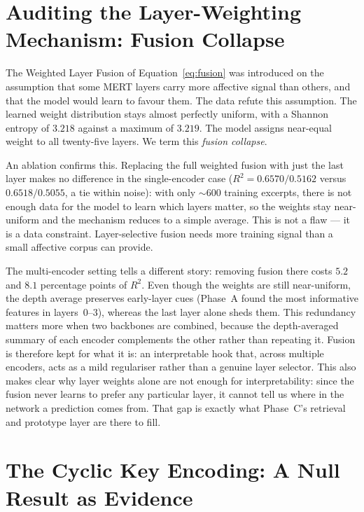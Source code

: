 \documentclass[12pt]{report}
\begin{document}
\section{Auditing the Layer-Weighting Mechanism: Fusion Collapse}
\label{sec:results-fusion}

The Weighted Layer Fusion of Equation~\ref{eq:fusion} was introduced on the assumption that some MERT layers carry more affective signal than others, and that the model would learn to favour them. The data refute this assumption. The learned weight distribution stays almost perfectly uniform, with a Shannon entropy of $3.218$ against a maximum of $3.219$. The model assigns near-equal weight to all twenty-five layers. We term this \emph{fusion collapse}.

An ablation confirms this. Replacing the full weighted fusion with just the last layer makes no difference in the single-encoder case ($R^{2}=0.6570/0.5162$ versus $0.6518/0.5055$, a tie within noise): with only $\sim\!600$ training excerpts, there is not enough data for the model to learn which layers matter, so the weights stay near-uniform and the mechanism reduces to a simple average. This is not a flaw --- it is a data constraint. Layer-selective fusion needs more training signal than a small affective corpus can provide.

The multi-encoder setting tells a different story: removing fusion there costs $5.2$ and $8.1$ percentage points of $R^{2}$. Even though the weights are still near-uniform, the depth average preserves early-layer cues (Phase~A found the most informative features in layers~$0$--$3$), whereas the last layer alone sheds them. This redundancy matters more when two backbones are combined, because the depth-averaged summary of each encoder complements the other rather than repeating it. Fusion is therefore kept for what it is: an interpretable hook that, across multiple encoders, acts as a mild regulariser rather than a genuine layer selector. This also makes clear why layer weights alone are not enough for interpretability: since the fusion never learns to prefer any particular layer, it cannot tell us where in the network a prediction comes from. That gap is exactly what Phase~C's retrieval and prototype layer are there to fill.

\section{The Cyclic Key Encoding: A Null Result as Evidence}
\label{sec:results-cyclic}
\end{document}
